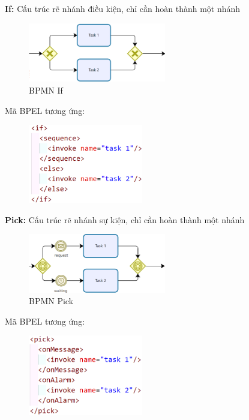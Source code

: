 \textbf{If:} Cấu trúc rẽ nhánh điều kiện, chỉ cần hoàn thành một nhánh
\begin{figure}[!htp]
    \begin{center}
        \includegraphics[width=6cm]{img/Theory/tranfer/If.png}
    \end{center}
    \caption{BPMN If}
\end{figure}
\par Mã BPEL tương ứng:
\begin{figure}[!htp]
    \begin{center}
        \includegraphics[width=5cm]{img/Theory/tranfer/IfCode.png}
    \end{center}
\end{figure}


\textbf{Pick:}  Cấu trúc rẽ nhánh sự kiện, chỉ cần hoàn thành một nhánh
\begin{figure}[!htp]
    \begin{center}
        \includegraphics[width=6cm]{img/Theory/tranfer/pick.png}
    \end{center}
    \caption{BPMN Pick}
\end{figure}
\par Mã BPEL tương ứng:
\begin{figure}[!htp]
    \begin{center}
        \includegraphics[width=5cm]{img/Theory/tranfer/pickCode.png}
    \end{center}
\end{figure}

